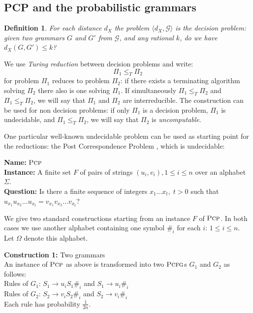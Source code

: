 \documentclass[submission]{eptcs} \usepackage{breakurl}             \usepackage[english]{babel}
\newtheorem{definition}{Definition}
\providecommand{\Grammarclass}{\ensuremath{\mathcal{G}}}
\providecommand{\PCFG}{\ensuremath{\textsc{Pcfg}}}
\providecommand{\PCP}{\ensuremath{\textsc{Pcp}}}
\providecommand{\gives}{\ensuremath{\mathop{\rightarrow}}}
\begin{document}
\subsection{PCP and the probabilistic grammars}
\begin{definition}
For each distance  $d_X$ the problem $\langle d_X,\Grammarclass\rangle$ is the decision problem: given two grammars $G$ and $G'$ from $\Grammarclass$, and any rational $k$, do we have $d_X(G,G')\le k$?
\end{definition}
We  use \emph{Turing reduction} between decision problems and write:
$$
\Pi_1\le_T\Pi_2
$$
for problem $\Pi_1$ reduces to problem $\Pi_2$: if there exists a terminating algorithm solving $\Pi_2$ there also is one solving $\Pi_1$. If simultaneously $\Pi_1\le_T\Pi_2$ and $\Pi_1\le_T\Pi_2$, we will say that $\Pi_1$ and $\Pi_2$ are interreducible. The construction can be used for non decision problems: if only $\Pi_1$ is a decision problem, $\Pi_1$ is undecidable, and $\Pi_1\le_T\Pi_2$,  we will say that $\Pi_2$ is \emph{uncomputable}.


One particular well-known undecidable problem can be used as starting point for the reductions: the Post Correspondence Problem \cite{post46}, which is undecidable:


\noindent\textbf{Name:} $\PCP$  \\
\textbf{Instance:} A finite set $F$ of pairs of strings $(u_i,v_i), 1\le i\le n$ over an alphabet $\Sigma$.\\
\textbf{Question:} Is there a finite sequence of integers $x_1\dots x_t,\; t>0 $ such that $u_{x_1}u_{x_2}\dots u_{x_t}=v_{x_1}v_{x_2}\dots v_{x_t}$?
\vspace{0.1in}

We give two standard constructions starting from an instance $F$ of $\PCP$. In both cases we use another alphabet containing one symbol $\#_i$ for each $i:\, 1\le i\le n$. Let $\Omega$ denote this alphabet.

\vspace{0.1in}
\noindent\textbf{Construction 1:} Two grammars  \\
An instance of $\PCP$ as above is transformed into two $\PCFG$s $G_1$ and $G_2$ as follows:\\
Rules of $G_1$: $S_1\gives u_iS_1\#_i$ and $S_1\gives u_i\#_i$ \\
Rules of $G_2$: $S_2\gives v_iS_2\#_i$ and $S_2\gives v_i\#_i$\\
Each rule has  probability $\frac{1}{2n}$.
\end{document}
